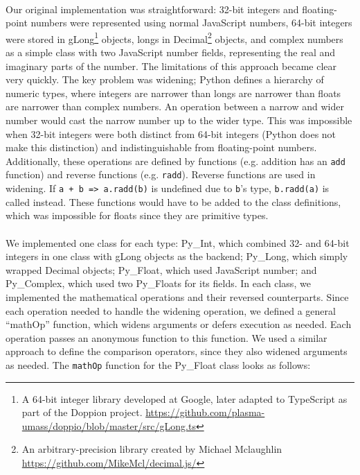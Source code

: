 \documentclass{article}
\begin{document}
\paragraph{}
Our original implementation was straightforward: 32-bit integers and floating-point numbers were represented using normal JavaScript numbers, 64-bit integers were stored in gLong\footnote{A 64-bit integer library developed at Google, later adapted to TypeScript as part of the Doppion project. \url{https://github.com/plasma-umass/doppio/blob/master/src/gLong.ts}} objects, longs in Decimal\footnote{An arbitrary-precision library created by Michael Mclaughlin \url{https://github.com/MikeMcl/decimal.js/}} objects, and complex numbers as a simple class with two JavaScript number fields, representing the real and imaginary parts of the number. The limitations of this approach became clear very quickly. The key problem was widening; Python defines a hierarchy of numeric types, where integers are narrower than longs are narrower than floats are narrower than complex numbers. An operation between a narrow and wider number would cast the narrow number up to the wider type. This was impossible when 32-bit integers were both distinct from 64-bit integers (Python does not make this distinction) and indistinguishable from floating-point numbers. Additionally, these operations are defined by functions (e.g. addition has an \texttt{add} function) and reverse functions (e.g. \texttt{radd}). Reverse functions are used in widening. If \texttt{a + b => a.radd(b)} is undefined due to \texttt{b}'s type, \texttt{b.radd(a)} is called instead. These functions would have to be added to the class definitions, which was impossible for floats since they are primitive types.

\paragraph{}
We implemented one class for each type: Py\_Int, which combined 32- and 64-bit integers in one class with gLong objects as the backend; Py\_Long, which simply wrapped Decimal objects; Py\_Float, which used JavaScript number; and Py\_Complex, which used two Py\_Floats for its fields. In each class, we implemented the mathematical operations and their reversed counterparts. Since each operation needed to handle the widening operation, we defined a general ``mathOp'' function, which widens arguments or defers execution as needed. Each operation passes an anonymous function to this function. We used a similar approach to define the comparison operators, since they also widened arguments as needed. The \texttt{mathOp} function for the Py\_Float class looks as follows:
\end{document}
